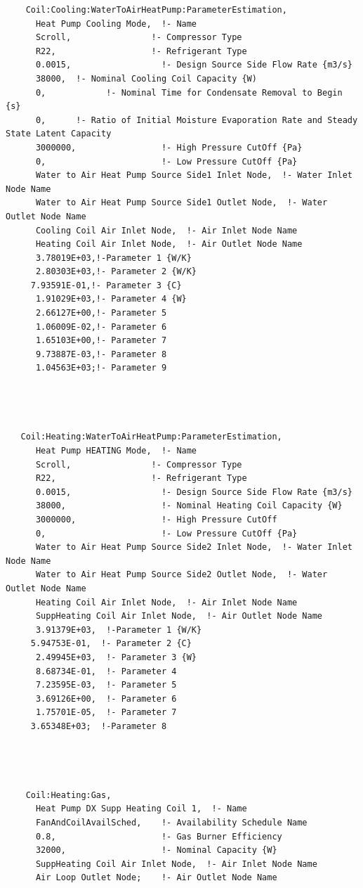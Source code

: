 \begin{lstlisting}
    Coil:Cooling:WaterToAirHeatPump:ParameterEstimation,
      Heat Pump Cooling Mode,  !- Name
      Scroll,                !- Compressor Type
      R22,                   !- Refrigerant Type
      0.0015,                  !- Design Source Side Flow Rate {m3/s}
      38000,  !- Nominal Cooling Coil Capacity {W)
      0,            !- Nominal Time for Condensate Removal to Begin {s}
      0,      !- Ratio of Initial Moisture Evaporation Rate and Steady State Latent Capacity
      3000000,                 !- High Pressure CutOff {Pa}
      0,                       !- Low Pressure CutOff {Pa}
      Water to Air Heat Pump Source Side1 Inlet Node,  !- Water Inlet Node Name
      Water to Air Heat Pump Source Side1 Outlet Node,  !- Water Outlet Node Name
      Cooling Coil Air Inlet Node,  !- Air Inlet Node Name
      Heating Coil Air Inlet Node,  !- Air Outlet Node Name
      3.78019E+03,!-Parameter 1 {W/K}
      2.80303E+03,!- Parameter 2 {W/K}
     7.93591E-01,!- Parameter 3 {C}
      1.91029E+03,!- Parameter 4 {W}
      2.66127E+00,!- Parameter 5
      1.06009E-02,!- Parameter 6
      1.65103E+00,!- Parameter 7
      9.73887E-03,!- Parameter 8
      1.04563E+03;!- Parameter 9




   Coil:Heating:WaterToAirHeatPump:ParameterEstimation,
      Heat Pump HEATING Mode,  !- Name
      Scroll,                !- Compressor Type
      R22,                   !- Refrigerant Type
      0.0015,                  !- Design Source Side Flow Rate {m3/s}
      38000,                   !- Nominal Heating Coil Capacity {W}
      3000000,                 !- High Pressure CutOff
      0,                       !- Low Pressure CutOff {Pa}
      Water to Air Heat Pump Source Side2 Inlet Node,  !- Water Inlet Node Name
      Water to Air Heat Pump Source Side2 Outlet Node,  !- Water Outlet Node Name
      Heating Coil Air Inlet Node,  !- Air Inlet Node Name
      SuppHeating Coil Air Inlet Node,  !- Air Outlet Node Name
      3.91379E+03,  !-Parameter 1 {W/K}
     5.94753E-01,  !- Parameter 2 {C}
      2.49945E+03,  !- Parameter 3 {W}
      8.68734E-01,  !- Parameter 4
      7.23595E-03,  !- Parameter 5
      3.69126E+00,  !- Parameter 6
      1.75701E-05,  !- Parameter 7
     3.65348E+03;  !-Parameter 8




    Coil:Heating:Gas,
      Heat Pump DX Supp Heating Coil 1,  !- Name
      FanAndCoilAvailSched,    !- Availability Schedule Name
      0.8,                     !- Gas Burner Efficiency
      32000,                   !- Nominal Capacity {W}
      SuppHeating Coil Air Inlet Node,  !- Air Inlet Node Name
      Air Loop Outlet Node;    !- Air Outlet Node Name





\end{lstlisting}
